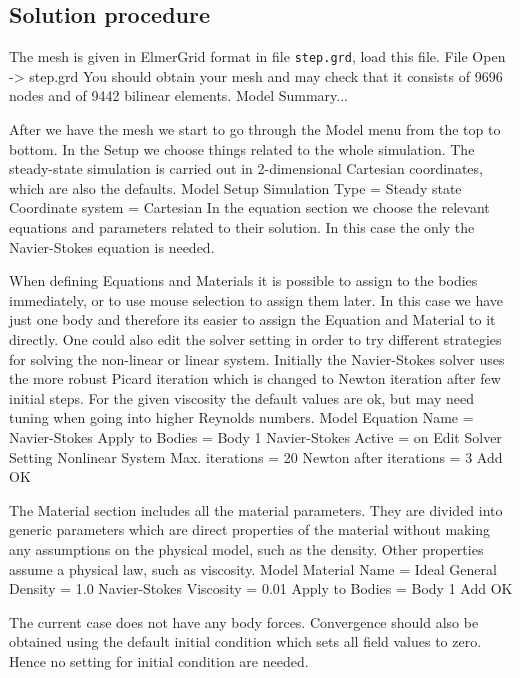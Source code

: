 \subsection*{Solution procedure}

The mesh is given in ElmerGrid format in file \texttt{step.grd}, load this file.
\ttbegin
File 
  Open -> step.grd
\ttend
You should obtain your mesh and may check that it consists of 9696 nodes and of 
9442 bilinear elements.
\ttbegin
Model 
  Summary...
\ttend

After we have the mesh we start to go through the Model menu from the top to bottom. 
In the Setup we choose things related to the whole simulation.
The steady-state simulation is carried out in 2-dimensional Cartesian
coordinates, which are also the defaults.  
\ttbegin
Model
  Setup 
    Simulation Type = Steady state
    Coordinate system = Cartesian
\ttend
In the equation section we choose the relevant equations and parameters related to their solution. 
In this case the only the Navier-Stokes equation is needed.

When defining Equations and Materials it is possible to assign to the bodies immediately, or to use mouse
selection to assign them later. In this case we have just one body and therefore its easier to assign 
the Equation and Material to it directly. One could also edit the solver setting in order to
try different strategies for solving the non-linear or linear system. Initially the Navier-Stokes
solver uses the more robust Picard iteration which is changed to Newton iteration after few initial steps.
For the given viscosity the default values are ok, but may need tuning when going into higher Reynolds numbers.
\ttbegin
Model
  Equation
    Name = Navier-Stokes
    Apply to Bodies = Body 1
    Navier-Stokes 
      Active = on
      Edit Solver Setting
        Nonlinear System
          Max. iterations = 20
          Newton after iterations = 3
    Add 
    OK
\ttend        

The Material section includes all the material parameters.
They are divided into generic parameters which are direct properties of the material
without making any assumptions on the physical model, such as the density. Other properties assume
a physical law, such as viscosity. 
\ttbegin
Model
  Material
    Name = Ideal
    General 
      Density = 1.0
    Navier-Stokes 
      Viscosity = 0.01
    Apply to Bodies = Body 1 
    Add
    OK
\ttend

The current case does not have any body forces. Convergence should also be
obtained using the default initial condition which sets all field values to zero. 
Hence no setting for initial condition are needed. 

